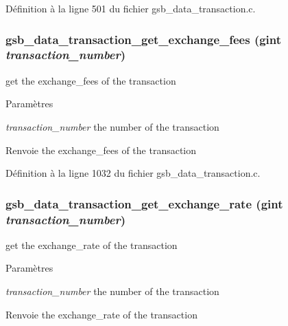 Définition à la ligne 501 du fichier gsb\_\-data\_\-transaction.c.

\subsubsection[{gsb\_\-data\_\-transaction\_\-get\_\-exchange\_\-fees}]{ gsb\_\-data\_\-transaction\_\-get\_\-exchange\_\-fees (gint {\em transaction\_\-number})}\label{gsb__data__transaction_8c_ae9b1f8064c54242943010ba571769529}
get the exchange\_\-fees of the transaction


\begin{DoxyParams}{Paramètres}
\item[{\em transaction\_\-number}]the number of the transaction\end{DoxyParams}
\begin{DoxyReturn}{Renvoie}
the exchange\_\-fees of the transaction 
\end{DoxyReturn}


Définition à la ligne 1032 du fichier gsb\_\-data\_\-transaction.c.

\subsubsection[{gsb\_\-data\_\-transaction\_\-get\_\-exchange\_\-rate}]{ gsb\_\-data\_\-transaction\_\-get\_\-exchange\_\-rate (gint {\em transaction\_\-number})}\label{gsb__data__transaction_8c_a4a80a52634eeaaaa3b1ad3ad2e83389f}
get the exchange\_\-rate of the transaction


\begin{DoxyParams}{Paramètres}
\item[{\em transaction\_\-number}]the number of the transaction\end{DoxyParams}
\begin{DoxyReturn}{Renvoie}
the exchange\_\-rate of the transaction 
\end{DoxyReturn}


